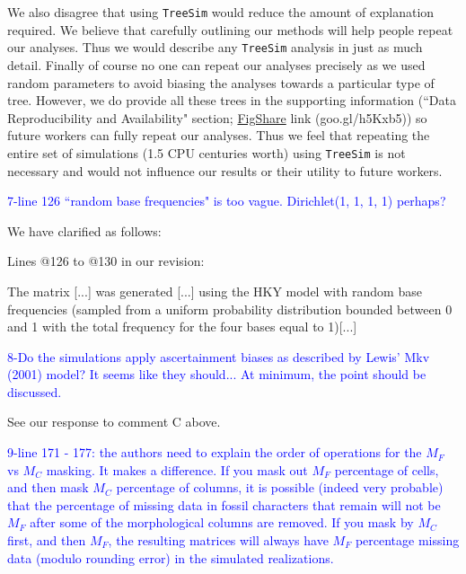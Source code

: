 \documentclass[11pt]{letter}
\begin{document}
\begin{letter}{}
We also disagree that using \texttt{TreeSim} would reduce the amount of explanation required. We believe that carefully outlining our methods will help people repeat our analyses. Thus we would describe any \texttt{TreeSim} analysis in just as much detail.
Finally of course no one can repeat our analyses precisely as we used random parameters to avoid biasing the analyses towards a particular type of tree. However, we do provide all these trees in the supporting information (``Data Reproducibility and Availability" section; \href{http://figshare.com/articles/Effect_of_missing_data_on_topological_inference_using_a_total_evidence_approach/1306861}{FigShare} link (goo.gl/h5Kxb5)) so future workers can fully repeat our analyses. Thus we feel that repeating the entire set of simulations (1.5 CPU centuries worth) using \texttt{TreeSim} is not necessary and would not influence our results or their utility to future workers.


\textcolor{blue}{7-line 126 ``random base frequencies" is too vague. Dirichlet(1, 1, 1, 1) perhaps?}

We have clarified as follows:

Lines @126 to @130 in our revision:

\hfill\begin{minipage}{\dimexpr\textwidth-1cm}
The matrix [...] was generated [...] using the HKY model with random base frequencies (sampled from a uniform probability distribution bounded between 0 and 1 with the total frequency for the four bases equal to 1)[...]
\end{minipage}


\textcolor{blue}{8-Do the simulations apply ascertainment biases as described by Lewis' Mkv (2001) model? It seems like they should... At minimum, the point should be discussed.}

See our response to comment C above.


\textcolor{blue}{9-line 171 - 177: the authors need to explain the order of operations for the $M_F$ vs $M_C$ masking. It makes a difference. If you mask out $M_F$ percentage of cells, and then mask $M_C$ percentage of columns, it is possible (indeed very probable) that the percentage of missing data in fossil characters that remain will not be $M_F$ after some of the morphological columns are removed. If you mask by $M_C$ first, and then $M_F$, the resulting matrices will always have $M_F$ percentage missing data (modulo rounding error) in the simulated realizations.}


\end{letter}
\end{document}

